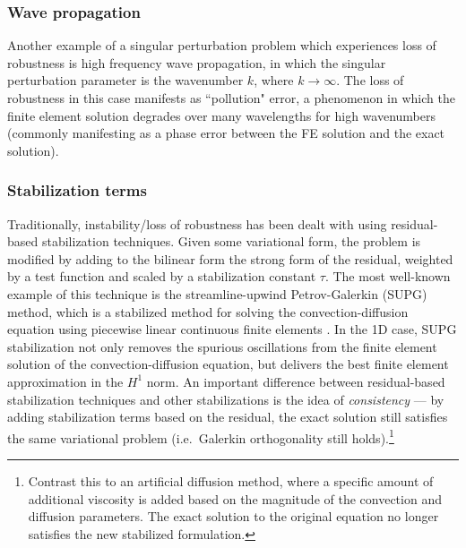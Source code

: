 \documentclass[11pt,onecolumn]{scrartcl}
\begin{document}

\subsubsection{Wave propagation}

Another example of a singular perturbation problem which experiences loss of robustness is high frequency wave propagation, in which the singular perturbation parameter is the wavenumber $k$, where $k\rightarrow \infty$. The loss of robustness in this case manifests as ``pollution" error, a phenomenon in which the finite element solution degrades over many wavelengths for high wavenumbers (commonly manifesting as a phase error between the FE solution and the exact solution).  

\subsubsection{Stabilization terms}

Traditionally, instability/loss of robustness has been dealt with using residual-based stabilization techniques.  Given some variational form, the problem is modified by adding to the bilinear form the strong form of the residual, weighted by a test function and scaled by a stabilization constant $\tau$.  The most well-known example of this technique is the streamline-upwind Petrov-Galerkin (SUPG) method, which is a stabilized method for solving the convection-diffusion equation using piecewise linear continuous finite elements \cite{SUPG}.  In the 1D case, SUPG stabilization not only removes the spurious oscillations from the finite element solution of the convection-diffusion equation, but delivers the best finite element approximation in the $H^1$ norm.  An important difference between residual-based stabilization techniques and other stabilizations is the idea of \textit{consistency} --- by adding stabilization terms based on the residual, the exact solution still satisfies the same variational problem (i.e.\ Galerkin orthogonality still holds).\footnote{Contrast this to an artificial diffusion method, where a specific amount of additional viscosity is added based on the magnitude of the convection and diffusion parameters. The exact solution to the original equation no longer satisfies the new stabilized formulation.}
\end{document}

